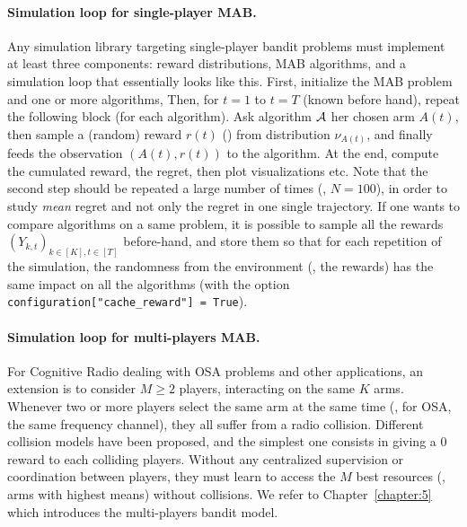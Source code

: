 \paragraph{Simulation loop for single-player MAB.}
%
Any simulation library targeting single-player bandit problems must implement at least three components:
reward distributions, MAB algorithms, and a simulation loop that essentially looks like this.
    First, initialize the MAB problem and one or more algorithms,
    Then, for $t=1$ to $t=T$ (known before hand), repeat the following block (for each algorithm). Ask algorithm $\mathcal{A}$ her chosen arm $A(t)$, then sample a (random) reward $r(t)$ (\iid) from distribution $\nu_{A(t)}$, and finally feeds the observation $(A(t), r(t))$ to the algorithm.
    At the end, compute the cumulated reward, the regret, then plot visualizations etc.
%
Note that the second step should be repeated a large number of times (\eg, $N=100$), in order to study \emph{mean} regret and not only the regret in one single trajectory.
If one wants to compare algorithms on a same problem, it is possible to sample all the rewards $(Y_{k,t})_{k\in[K], t\in[T]}$ before-hand, and store them so that for each repetition of the simulation, the randomness from the environment (\ie, the rewards) has the same impact on all the algorithms (with the option \texttt{configuration["cache\_reward"] = True}).


\paragraph{Simulation loop for multi-players MAB.}
%
For Cognitive Radio dealing with OSA problems and other applications, an extension is to consider $M\geq2$ players, interacting on the same $K$ arms.
Whenever two or more players select the same arm at the same time (\eg, for OSA, the same frequency channel), they all suffer from a radio collision.
%
Different collision models have been proposed, and the simplest one consists in giving a $0$ reward to each colliding players.
Without any centralized supervision or coordination between players, they must learn to access the $M$ best resources (\ie, arms with highest means) without collisions.
We refer to Chapter~\ref{chapter:5} which introduces the multi-players bandit model.


